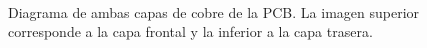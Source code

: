 \begin{figure}[H]
    \centering
    \\
    \caption{Diagrama de ambas capas de cobre de la PCB. La imagen superior corresponde a la capa frontal y la inferior a la capa trasera.}
    \label{fig:PCB_cobre}
\end{figure}